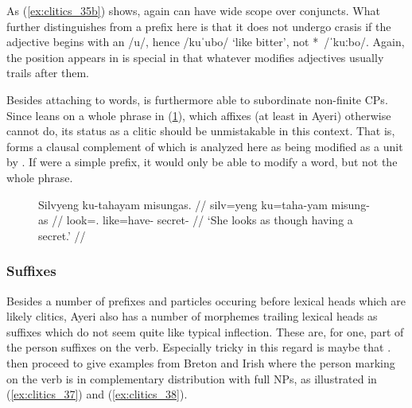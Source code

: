 As (\ref{ex:clitics_35b}) shows,  again can have wide scope over
conjuncts. What further distinguishes  from a prefix here is
that it does not undergo crasis if the adjective begins with an /u/, hence
 /kuˈubo/ `like bitter', not *\,
/ˈkuːbo/. Again, the position  appears in is special in that
whatever modifies adjectives usually trails after them.

\label{clitics_preverb_ku}
Besides attaching to words,  is furthermore able to subordinate
non-finite CPs. Since  leans on a whole phrase in
(\ref{ex:clitics_36}), which affixes (at least in Ayeri) otherwise cannot do,
its status as a clitic should be unmistakable in this context. That is,
 forms a clausal
complement of  which is analyzed here as
being modified as a unit by . If  were a simple
prefix, it would only be able to modify a word, but not the whole phrase.

\begin{figure}[h]
\ex\label{ex:clitics_36}\begingl
	\gla Silvyeng ku-tahayam misungas. //
	\glb silv=yeng ku=taha-yam misung-as //
	\glc look=\TsgF{}.\Aarg{} like=have-\Ptcp{} secret-\Parg{} //
	\glft `She looks as though having a secret.' //
\endgl\xe
\end{figure}

\subsubsection{Suffixes}
\label{subsubsec:suffixes}

\label{clitics_postverb_person}
Besides a number of prefixes and particles occuring before lexical heads which
are likely clitics, Ayeri also has a number of morphemes trailing lexical heads
as suffixes which do not seem quite like typical inflection. These are, for
one, part of the person suffixes on the verb. Especially tricky in this regard
is maybe that  \parencites[144]{spencerluis2012}[also
compare][101]{corbett2006}. \citet{spencerluis2012} then proceed to give
examples from Breton and Irish where the person marking on the verb is in
complementary distribution with full NPs, as illustrated in
(\ref{ex:clitics_37}) and (\ref{ex:clitics_38}).

